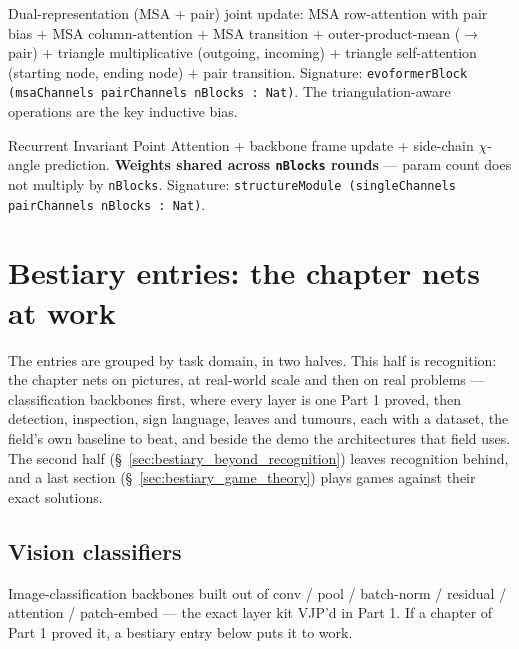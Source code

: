 \begin{definition}
  \label{layer:evoformerBlock}
  \leanok
  Dual-representation (MSA + pair) joint update: MSA row-attention with
  pair bias + MSA column-attention + MSA transition +
  outer-product-mean ($\to$ pair) + triangle multiplicative (outgoing,
  incoming) + triangle self-attention (starting node, ending node) +
  pair transition. Signature:
  \texttt{evoformerBlock (msaChannels pairChannels nBlocks : Nat)}.
  The triangulation-aware operations are the key inductive bias.
\end{definition}

\begin{definition}
  \label{layer:structureModule}
  \leanok
  Recurrent Invariant Point Attention + backbone frame update +
  side-chain $\chi$-angle prediction. \textbf{Weights shared across
  \texttt{nBlocks} rounds} --- param count does not multiply by
  \texttt{nBlocks}. Signature:
  \texttt{structureModule (singleChannels pairChannels nBlocks : Nat)}.
\end{definition}

\section{Bestiary entries: the chapter nets at work}
\label{sec:bestiary_entries}

The entries are grouped by task domain, in two halves. This half is
recognition: the chapter nets on pictures, at real-world scale and then on
real problems --- classification backbones first, where every layer is one
Part 1 proved, then detection, inspection, sign language, leaves and
tumours, each with a dataset, the field's own baseline to beat, and beside
the demo the architectures that field uses. The second half
(\S~\ref{sec:bestiary_beyond_recognition}) leaves recognition behind, and a last
section (\S~\ref{sec:bestiary_game_theory}) plays games against their exact solutions.

\subsection{Vision classifiers}

Image-classification backbones built out of conv / pool / batch-norm /
residual / attention / patch-embed --- the exact layer kit VJP'd in
Part 1. If a chapter of Part 1 proved it, a bestiary entry below puts
it to work.

